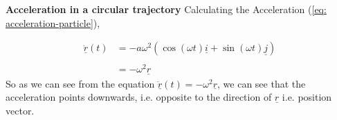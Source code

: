 	{\bf Acceleration in a circular trajectory}
Calculating the Acceleration (\ref{eq: acceleration-particle}),

$$\begin{aligned} \underline{\ddot{r}}(t) & = -a\omega^{2}(\cos(\omega t)\underline{i} + \sin(\omega t)\underline{j}) \\ \\
                                        & = -\omega^{2}\underline{r}\end{aligned}$$
So as we can see from the equation $\underline{\ddot{r}}(t) = -\omega^{2}\underline{r}$, we can see that the acceleration points downwards, i.e. opposite to the direction of $\underline{r}$ i.e. position vector.


\begin{figure}[H]
\centering
{} %
\begin{tikzpicture}[x=0.75pt,y=0.75pt,yscale=-1,xscale=1]


\end{tikzpicture}
\end{figure}
